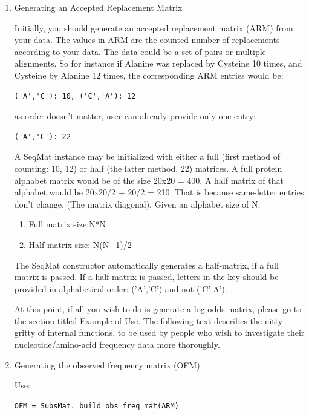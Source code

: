 \documentclass{report}
\begin{document}
\begin{enumerate}
   \begin{enumerate}

   \item Generating an Accepted Replacement Matrix

   Initially, you should generate an accepted replacement matrix (ARM) from your data. The values in ARM are the counted number of replacements according to your data. The data could be a set of pairs or multiple alignments. So for instance if Alanine was replaced by Cysteine 10 times, and Cysteine by Alanine 12 times, the corresponding ARM entries would be:

\begin{verbatim}
('A','C'): 10, ('C','A'): 12
\end{verbatim}

as order doesn't matter, user can already provide only one entry:

\begin{verbatim}
('A','C'): 22
\end{verbatim}

 A SeqMat instance may be initialized with either a full (first method of counting: 10, 12) or half (the latter method, 22) matrices. A full protein
   alphabet matrix would be of the size 20x20 = 400. A half matrix of that alphabet would be 20x20/2 + 20/2 = 210. That is because same-letter entries don't
   change. (The matrix diagonal). Given an alphabet size of N:

   \begin{enumerate}
     \item Full matrix size:N*N

     \item Half matrix size: N(N+1)/2
   \end{enumerate}

The SeqMat constructor automatically generates a half-matrix, if a full matrix is passed. If a half matrix is passed, letters in the key should be provided in alphabetical order: ('A','C') and not ('C',A').

At this point, if all you wish to do is generate a log-odds matrix, please go to the section titled Example of Use. The following text describes the nitty-gritty of internal functions, to be used by people who wish to investigate their nucleotide/amino-acid frequency data more thoroughly.

\item Generating the observed frequency matrix (OFM)

Use:
\begin{verbatim}
OFM = SubsMat._build_obs_freq_mat(ARM)
\end{verbatim}


\end{enumerate}
\end{enumerate}
\end{document}
